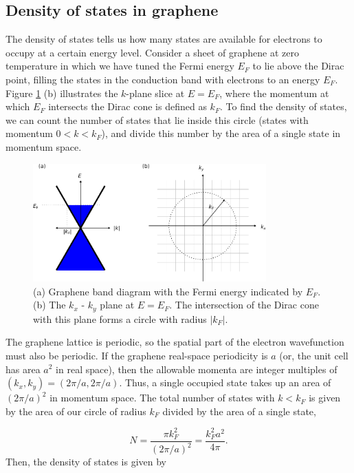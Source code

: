 \documentclass[double,12pt,1in,seploa]{beavtex}
\let\Oldsubsection\subsection
\renewcommand{\subsection}{\FloatBarrier\Oldsubsection}
\begin{document}
\subsection{Density of states in graphene}
The density of states tells us how many states are available for electrons to occupy at a certain energy level. Consider a sheet of graphene at zero temperature in which we have tuned the Fermi energy $E_F$ to lie above the Dirac point, filling the states in the conduction band with electrons to an energy $E_F$. Figure \ref{density of states graphic} (b) illustrates the $k$-plane slice at $E = E_F$, where the momentum at which $E_F$ intersects the Dirac cone is defined as $k_F$. To find the density of states, we can count the number of states that lie inside this circle (states with momentum $0 < k < k_F$), and divide this number by the area of a single state in momentum space.

\begin{figure}
    \includegraphics[width = 0.8\textwidth]{density of states graphic.pdf}
    \caption{(a) Graphene band diagram with the Fermi energy indicated by $E_F$. (b) The $k_x$ - $k_y$ plane at $E = E_F$. The intersection of the Dirac cone with this plane forms a circle with radius $|k_F|$.}
    \label{density of states graphic}
\end{figure}
The graphene lattice is periodic, so the spatial part of the electron wavefunction must also be periodic. If the graphene real-space periodicity is $a$ (or, the unit cell has area $a^2$ in real space), then the allowable momenta are integer multiples of $(k_x, k_y) = (2\pi/a, 2\pi/a)$. Thus, a single occupied state takes up an area of $(2\pi/a)^2$ in momentum space. The total number of states with $k < k_F$ is given by the area of our circle of radius $k_F$ divided by the area of a single state,

\begin{equation}
    N = \frac{\pi k_F^2}{(2\pi/a)^2} = \frac{k_F^2 a^2}{4\pi}. 
\end{equation}
Then, the density of states is given by 
\end{document}

